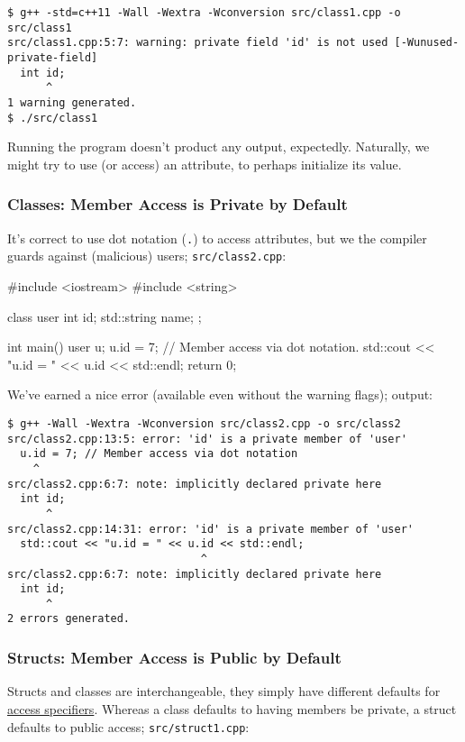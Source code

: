 \documentclass[12pt,letterpaper,twoside]{article}
\begin{document}
\begin{verbatim}
$ g++ -std=c++11 -Wall -Wextra -Wconversion src/class1.cpp -o src/class1
src/class1.cpp:5:7: warning: private field 'id' is not used [-Wunused-private-field]
  int id;
      ^
1 warning generated.
$ ./src/class1
\end{verbatim}

Running the program doesn't product any output, expectedly. Naturally, 
we might try to use (or access) an attribute, to perhaps initialize its value.

\subsubsection{Classes: Member Access is Private by Default}
It's correct to use dot notation (\texttt{.}) to access attributes, but we 
the compiler guards against (malicious) users;
\texttt{src/class2.cpp}:

\begin{cpp}
#include <iostream>
#include <string>

class user {
  int id;
  std::string name;
};

int main() {
  user u;
  u.id = 7; // Member access via dot notation.
  std::cout << "u.id = " << u.id << std::endl;
  return 0;
}
\end{cpp}

We've earned a nice error (available even without the warning flags);
output:

\begin{verbatim}
$ g++ -Wall -Wextra -Wconversion src/class2.cpp -o src/class2
src/class2.cpp:13:5: error: 'id' is a private member of 'user'
  u.id = 7; // Member access via dot notation
    ^
src/class2.cpp:6:7: note: implicitly declared private here
  int id;
      ^
src/class2.cpp:14:31: error: 'id' is a private member of 'user'
  std::cout << "u.id = " << u.id << std::endl;
                              ^
src/class2.cpp:6:7: note: implicitly declared private here
  int id;
      ^
2 errors generated.
\end{verbatim}

\subsubsection{Structs: Member Access is Public by Default} Structs and
classes are interchangeable, they simply have different defaults for
\href{https://en.cppreference.com/w/cpp/language/access}{access specifiers}. 
Whereas a 
class defaults to having members be private, a struct defaults to public access;
\texttt{src/struct1.cpp}:
\end{document}

